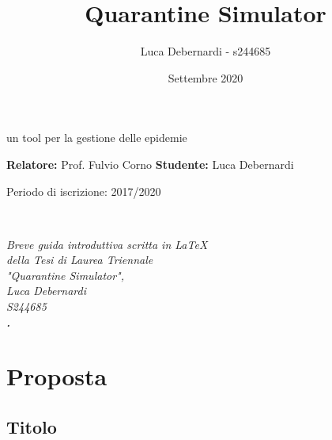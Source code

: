 \documentclass[a4paper, 12pt]{article}
\begin{document}
\begin{titlepage}
\begin{center}
		\vspace{0.1cm}
	
		\begin{large}
			un tool per la gestione delle epidemie\\
		\end{large}
	
		\vspace{1cm}
		
	\end{center}

	\textbf{Relatore:} Prof. Fulvio Corno
	\hfill
	\textbf{Studente:} Luca Debernardi
	
	\vfill
	
	\begin{center}
		Periodo di iscrizione: 2017/2020
	\end{center}
	
\end{titlepage}


\newpage

$\text{}$

\vfill

\begin{center}
	\emph{
	Breve guida introduttiva scritta in \LaTeX{}\\
	della Tesi di Laurea Triennale\\
	"Quarantine Simulator",\\
	Luca Debernardi\\
	S244685\\
	\textbf{.}}
\end{center}

\vspace{3cm}


\title{Quarantine Simulator}

\author{Luca Debernardi - s244685}
\date{Settembre 2020}

\maketitle

\tableofcontents

\listoffigures


\newpage

\section{Proposta}
	\subsection{Titolo}
	
\end{document}
